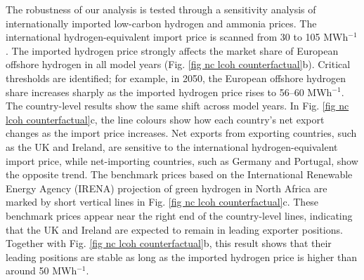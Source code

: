 \documentclass[pdflatex,sn-mathphys,Numbered]{sn-jnl}%
\begin{document}
The robustness of our analysis is tested through a sensitivity analysis of internationally imported low-carbon hydrogen and ammonia prices. The international hydrogen-equivalent import price is scanned from 30 to 105 \texteuro{} MWh$^{-1}$. The imported hydrogen price strongly affects the market share of European offshore hydrogen in all model years (Fig. \ref{fig nc lcoh counterfactual}b). Critical thresholds are identified; for example, in 2050, the European offshore hydrogen share increases sharply as the imported hydrogen price rises to 56--60 \texteuro{} MWh$^{-1}$. The country-level results show the same shift across model years. In Fig. \ref{fig nc lcoh counterfactual}c, the line colours show how each country's net export changes as the import price increases. Net exports from exporting countries, such as the UK and Ireland, are sensitive to the international hydrogen-equivalent import price, while net-importing countries, such as Germany and Portugal, show the opposite trend. The benchmark prices based on the International Renewable Energy Agency (IRENA) projection of green hydrogen in North Africa \cite{IRENAGlobalHydrogenTradeOutlook2022} are marked by short vertical lines in Fig. \ref{fig nc lcoh counterfactual}c. These benchmark prices appear near the right end of the country-level lines, indicating that the UK and Ireland are expected to remain in leading exporter positions. Together with Fig. \ref{fig nc lcoh counterfactual}b, this result shows that their leading positions are stable as long as the imported hydrogen price is higher than around 50 \texteuro{} MWh$^{-1}$.
\end{document}
